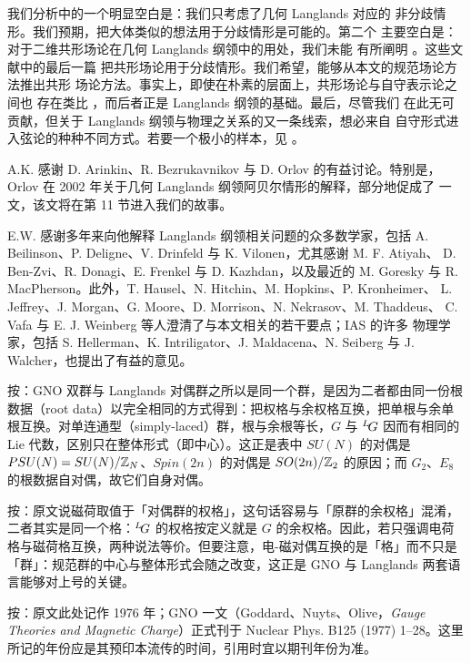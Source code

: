  我们分析中的一个明显空白是：我们只考虑了几何 Langlands 对应的
非分歧情形。我们预期，把大体类似的想法用于分歧情形是可能的。第二个
主要空白是：对于二维共形场论在几何 Langlands 纲领中的用处，我们未能
有所阐明 \cite{ref5,ref9,ref27,ref28,ref29,ref30}。这些文献中的最后一篇
把共形场论用于分歧情形。我们希望，能够从本文的规范场论方法推出共形
场论方法。事实上，即使在朴素的层面上，共形场论与自守表示论之间也
存在类比 \cite{ref31}，而后者正是 Langlands 纲领的基础。最后，尽管我们
在此无可贡献，但关于 Langlands 纲领与物理之关系的又一条线索，想必来自
自守形式进入弦论的种种不同方式。若要一个极小的样本，见
\cite{ref32,ref33,ref34,ref35,ref36,ref37,ref38,ref39,ref40}。

 A.K. 感谢 D. Arinkin、R. Bezrukavnikov 与 D. Orlov 的有益讨论。特别是，
Orlov 在 2002 年关于几何 Langlands 纲领阿贝尔情形的解释，部分地促成了
\cite{ref41} 一文，该文将在第 11 节进入我们的故事。

 E.W. 感谢多年来向他解释 Langlands 纲领相关问题的众多数学家，包括
A. Beilinson、P. Deligne、V. Drinfeld 与 K. Vilonen，尤其感谢 M. F. Atiyah、
D. Ben-Zvi、R. Donagi、E. Frenkel 与 D. Kazhdan，以及最近的 M. Goresky 与
R. MacPherson。此外，T. Hausel、N. Hitchin、M. Hopkins、P. Kronheimer、
L. Jeffrey、J. Morgan、G. Moore、D. Morrison、N. Nekrasov、M. Thaddeus、
C. Vafa 与 E. J. Weinberg 等人澄清了与本文相关的若干要点；IAS 的许多
物理学家，包括 S. Hellerman、K. Intriligator、J. Maldacena、N. Seiberg 与
J. Walcher，也提出了有益的意见。


\begin{yizhu}[物理图像]
按：GNO 双群与 Langlands 对偶群之所以是同一个群，是因为二者都由同一份根数据（root data）以完全相同的方式得到：把权格与余权格互换，把单根与余单根互换。对单连通型（simply-laced）群，根与余根等长，$G$ 与 ${}^L\negthinspace G$ 因而有相同的 Lie 代数，区别只在整体形式（即中心）。这正是表中 $SU(N)$ 的对偶是 $PSU(N)=SU(N)/\Bbb{Z}_N$、$Spin(2n)$ 的对偶是 $SO(2n)/\Bbb{Z}_2$ 的原因；而 $G_2$、$E_8$ 的根数据自对偶，故它们自身对偶。
\end{yizhu}

\begin{yizhu}[易错点]
按：原文说磁荷取值于「对偶群的权格」，这句话容易与「原群的余权格」混淆，二者其实是同一个格：${}^L\negthinspace G$ 的权格按定义就是 $G$ 的余权格。因此，若只强调电荷格与磁荷格互换，两种说法等价。但要注意，电-磁对偶互换的是「格」而不只是「群」：规范群的中心与整体形式会随之改变，这正是 GNO 与 Langlands 两套语言能够对上号的关键。
\end{yizhu}

\begin{yizhu}[原文疑误]
按：原文此处记作 1976 年；GNO 一文（Goddard、Nuyts、Olive，\emph{Gauge Theories and Magnetic Charge}）正式刊于 Nuclear Phys. B125 (1977) 1--28。这里所记的年份应是其预印本流传的时间，引用时宜以期刊年份为准。
\end{yizhu}

